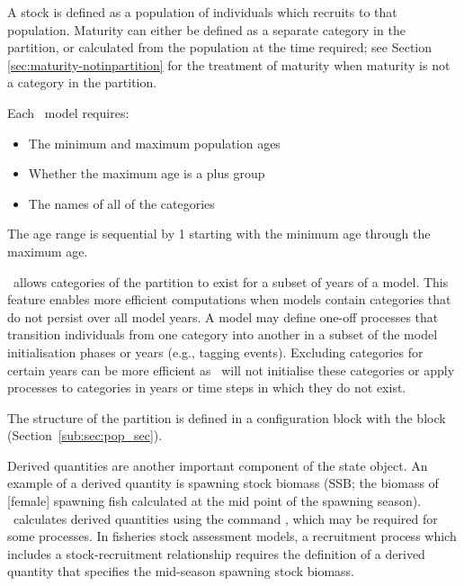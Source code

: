 A stock is defined as a population of individuals which recruits to that population. Maturity can either be defined as a separate category in the partition, or calculated from the population at the time required; see Section \ref{sec:maturity-notinpartition} for the treatment of maturity when maturity is not a category in the partition.

Each \CNAME\ model requires:

\begin{itemize}
\item The minimum and maximum population ages
\item Whether the maximum age is a plus group
\item The names of all of the categories
\end{itemize}

The age range is sequential by 1 starting with the minimum age through the maximum age.

\CNAME\ allows categories of the partition to exist for a subset of years of a model. This feature enables more efficient computations when models contain categories that do not persist over all model years. A model may define one-off processes that transition individuals from one category into another in a subset of the model initialisation phases or years (e.g., tagging events). Excluding categories for certain years can be more efficient as \CNAME\ will not initialise these categories or apply processes to categories in years or time steps in which they do not exist.

The structure of the partition is defined in a configuration block with the  block (Section~\ref{sub:sec:pop_sec}).

Derived quantities are another important component of the state object. An example of a derived quantity is spawning stock biomass (SSB; the biomass of [female] spawning fish calculated at the mid point of the spawning season). \CNAME\ calculates derived quantities using the command , which may be required for some processes. In fisheries stock assessment models, a recruitment process which includes a stock-recruitment relationship requires the definition of a derived quantity that specifies the mid-season spawning stock biomass.

\subsection{}

